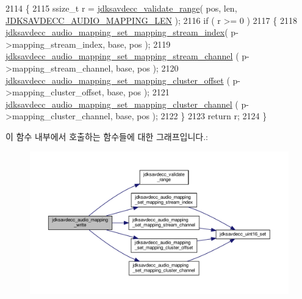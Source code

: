 \begin{DoxyCode}
2114 \{
2115     ssize\_t r = \hyperlink{group__util_ga9c02bdfe76c69163647c3196db7a73a1}{jdksavdecc\_validate\_range}( pos, len, 
      \hyperlink{group__audio__mapping_ga0dd006bf2320b99909db301f043f0cae}{JDKSAVDECC\_AUDIO\_MAPPING\_LEN} );
2116     \textcolor{keywordflow}{if} ( r >= 0 )
2117     \{
2118         \hyperlink{group__audio__mapping_ga19d7ad962d8f4da0ebb861cf3dcac0e1}{jdksavdecc\_audio\_mapping\_set\_mapping\_stream\_index}(
       p->mapping\_stream\_index, base, pos );
2119         \hyperlink{group__audio__mapping_gab6db9e6278806dc603040a6a64307f7b}{jdksavdecc\_audio\_mapping\_set\_mapping\_stream\_channel}
      ( p->mapping\_stream\_channel, base, pos );
2120         \hyperlink{group__audio__mapping_ga7f3899cb2a545c3b51c6eba8701632c8}{jdksavdecc\_audio\_mapping\_set\_mapping\_cluster\_offset}
      ( p->mapping\_cluster\_offset, base, pos );
2121         \hyperlink{group__audio__mapping_gaa9de5841a8f388d0ee56824fd906700d}{jdksavdecc\_audio\_mapping\_set\_mapping\_cluster\_channel}
      ( p->mapping\_cluster\_channel, base, pos );
2122     \}
2123     \textcolor{keywordflow}{return} r;
2124 \}
\end{DoxyCode}


이 함수 내부에서 호출하는 함수들에 대한 그래프입니다.\+:
\nopagebreak
\begin{figure}[H]
\begin{center}
\leavevmode
\includegraphics[width=350pt]{group__audio__mapping_gafe2b090b89f499663e46eb68754eca42_cgraph}
\end{center}
\end{figure}


